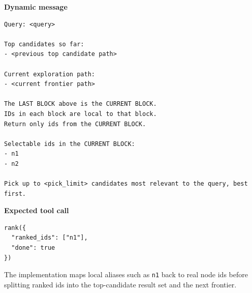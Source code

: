 \documentclass{article}
\begin{document}
\noindent\textbf{Dynamic message}
\begin{lstlisting}
Query: <query>

Top candidates so far:
- <previous top candidate path>

Current exploration path:
- <current frontier path>

The LAST BLOCK above is the CURRENT BLOCK.
IDs in each block are local to that block.
Return only ids from the CURRENT BLOCK.

Selectable ids in the CURRENT BLOCK:
- n1
- n2

Pick up to <pick_limit> candidates most relevant to the query, best first.
\end{lstlisting}

\noindent\textbf{Expected tool call}
\begin{lstlisting}
rank({
  "ranked_ids": ["n1"],
  "done": true
})
\end{lstlisting}

The implementation maps local aliases such as \texttt{n1} back to real node ids
before splitting ranked ids into the top-candidate result set and the next
frontier.
\end{document}
